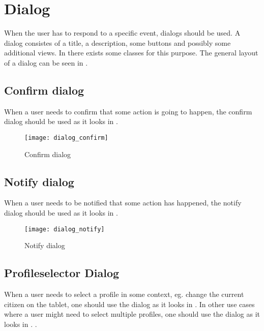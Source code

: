 
\chapter{Dialog}
\label{cha:dialog}

When the user has to respond to a specific event, dialogs should be used. A dialog consistes of a title, a description, some buttons and possibly some additional views. In \gc there exists some classes for this purpose. The general layout of a dialog can be seen in .

\section{Confirm dialog}
\label{sec:confirm_dialog}

When a user needs to confirm that some action is going to happen, the confirm dialog should be used as it looks in . 

\begin{figure}[h]
	\centering
	\texttt{[image: dialog\_confirm]}
	\caption{Confirm dialog}
	\label{fig:confirm_dialog}
\end{figure}
\FloatBarrier

\section{Notify dialog}
\label{sec:notify_dialog}

When a user needs to be notified that some action has happened, the notify dialog should be used as it looks in . 

\begin{figure}[h]
	\centering
	\texttt{[image: dialog\_notify]}
	\caption{Notify dialog}
	\label{fig:notify_dialog}
\end{figure}
\FloatBarrier

\section{Profileselector Dialog}
\label{sec:profileselector_dialog}

When a user needs to select a profile in some context, eg. change the current citizen on the tablet, one should use the dialog as it looks in . In other use cases where a user might need to select multiple profiles, one should use the dialog as it looks in . .


